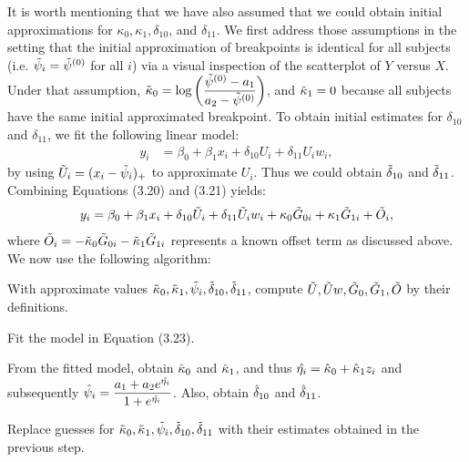 \documentclass [12pt, proquest] {uwthesis}[2016/11/22]
\begin{document}
It is worth mentioning that we have also assumed that we could obtain initial approximations for $\kappa_0, \kappa_1, \delta_{10}$, and $\delta_{11}$. We first address those assumptions in the setting that the initial approximation of breakpoints is identical for all subjects (i.e. $\Tilde{\psi}_i = \Tilde{\psi}^{(0)}$ for all $i$) via a visual inspection of the scatterplot of $Y$ versus $X$. Under that assumption, $\Tilde{\kappa}_0 = \log \left(\dfrac{\Tilde{\psi}^{(0)} - a_1}{a_2 - \Tilde{\psi}^{(0)}}\right)$, and $\Tilde{\kappa}_1 = 0$ because all subjects have the same initial approximated breakpoint. To obtain initial estimates for $\delta_{10}$ and $\delta_{11}$, we fit the following linear model:
\begin{align}
    y_i &= \beta_0 + \beta_1 x_i + \delta_{10} U_i + \delta_{11} U_i w_i,
\end{align}
by using $\Tilde{U}_i = (x_i - \Tilde{\psi}_i)_+$ to approximate $U_i$. Thus we could obtain $\Tilde{\delta}_{10}$ and $\Tilde{\delta}_{11}$. Combining Equations (3.20) and (3.21) yields:
\begin{align}
    y_i = \beta_0 + \beta_1 x_i + \delta_{10} \Tilde{U}_i + \delta_{11} \Tilde{U}_i w_i + \kappa_0 \Tilde{G}_{0i} + \kappa_1 \Tilde{G}_{1i} + \Tilde{O}_i,
\end{align}
where $\Tilde{O}_i = -\Tilde{\kappa}_0 \Tilde{G}_{0i} -\Tilde{\kappa}_1 \Tilde{G}_{1i}$ represents a known offset term as discussed above. We now use the following algorithm:
\begin{enumerate}
\begin{mybox}
    \item With approximate values $\Tilde{\kappa}_0, \Tilde{\kappa}_1, \Tilde{\psi}_i, \Tilde{\delta}_{10}, \Tilde{\delta}_{11}$, compute $\Tilde{U}, \Tilde{U}w, \Tilde{G}_0, \Tilde{G}_1, \Tilde{O}$ by their definitions.
    \item Fit the model in Equation (3.23).
    \item From the fitted model, obtain $\Hat{\kappa}_0$ and $\Hat{\kappa}_1$, and thus $\Hat{\eta_i} = \Hat{\kappa}_0 + \Hat{\kappa}_1 z_i$ and subsequently $\Hat{\psi}_i = \dfrac{a_1 + a_2 e^{\Hat{\eta_i}}}{1 + e^{\Hat{\eta_i}}}$. Also, obtain $\Hat{\delta}_{10}$ and $\Hat{\delta}_{11}$. \item Replace guesses for $\Tilde{\kappa}_0, \Tilde{\kappa}_1, \Tilde{\psi}_i, \Tilde{\delta}_{10}, \Tilde{\delta}_{11}$ with their estimates obtained in the previous step.
\end{mybox}
\end{enumerate}
\end{document}
